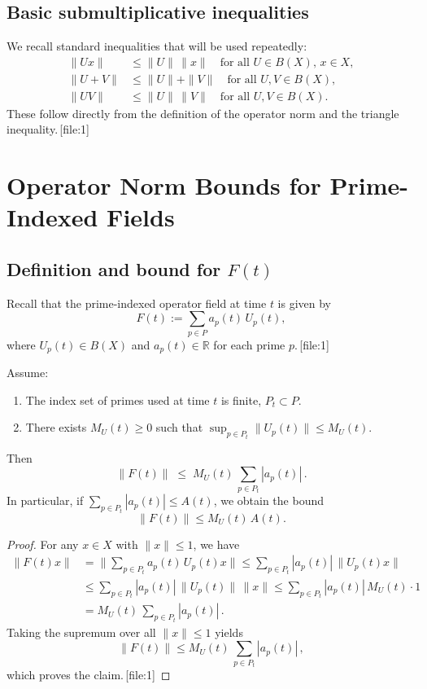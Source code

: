 \documentclass[11pt]{article}
\begin{document}
\subsection{Basic submultiplicative inequalities}

We recall standard inequalities that will be used repeatedly:
\begin{align}
  \|Ux\| &\le \|U\|\,\|x\| \quad \text{for all } U\in B(X),\,x\in X, \label{eq:submult1}\\
  \|U+V\| &\le \|U\| + \|V\| \quad \text{for all } U,V\in B(X), \label{eq:submult2}\\
  \|UV\| &\le \|U\|\,\|V\| \quad \text{for all } U,V\in B(X). \label{eq:submult3}
\end{align}
These follow directly from the definition of the operator norm and the triangle inequality.\,[file:1]

\section{Operator Norm Bounds for Prime-Indexed Fields}

\subsection{Definition and bound for $F(t)$}

Recall that the prime-indexed operator field at time $t$ is given by
\[
  F(t) := \sum_{p \in P} a_p(t)\,U_p(t),
\]
where $U_p(t)\in B(X)$ and $a_p(t)\in\mathbb{R}$ for each prime $p$.\,[file:1]

\begin{lemma}
Assume:
\begin{enumerate}
  \item The index set of primes used at time $t$ is finite, $P_t \subset P$.
  \item There exists $M_U(t)\ge 0$ such that $\sup_{p\in P_t} \|U_p(t)\|\le M_U(t)$.
\end{enumerate}
Then
\[
  \|F(t)\| \;\le\; M_U(t)\,\sum_{p\in P_t} |a_p(t)|\,.
\]
In particular, if $\sum_{p\in P_t} |a_p(t)|\le A(t)$, we obtain the bound
\[
  \|F(t)\| \le M_U(t)\,A(t).
\]
\end{lemma}

\begin{proof}
For any $x\in X$ with $\|x\|\le1$, we have
\begin{align*}
  \|F(t)x\|
  &= \Big\|\sum_{p\in P_t} a_p(t)\,U_p(t)x\Big\|
   \le \sum_{p\in P_t} |a_p(t)|\,\|U_p(t)x\| \\
  &\le \sum_{p\in P_t} |a_p(t)|\,\|U_p(t)\|\,\|x\|
   \le \sum_{p\in P_t} |a_p(t)|\,M_U(t)\cdot 1 \\
  &= M_U(t)\,\sum_{p\in P_t} |a_p(t)|\,.
\end{align*}
Taking the supremum over all $\|x\|\le 1$ yields
\[
  \|F(t)\| \le M_U(t)\,\sum_{p\in P_t} |a_p(t)|\,,
\]
which proves the claim.\,[file:1]
\end{proof}
\end{document}

